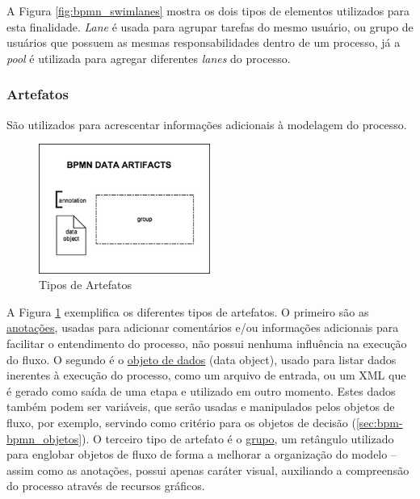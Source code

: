     A Figura \ref{fig:bpmn_swimlanes} mostra os dois tipos de elementos utilizados para esta finalidade. \textit{Lane} é usada para agrupar tarefas do mesmo usuário, ou grupo de usuários que possuem as mesmas responsabilidades dentro de um processo, já a \textit{pool} é utilizada para agregar diferentes \textit{lanes} do processo. 

\subsubsection{Artefatos}\label{sec:bpm-bpmn_objetos_artefatos}

    São utilizados para acrescentar informações adicionais à modelagem do processo. 

    \begin{figure}[H]
    \centering
    \includegraphics[width=0.5\textwidth]{imagens/bpmn_artifacts.png}
    \caption{Tipos de Artefatos\cite{tipos_artefatos}}
    \label{fig:bpmn_artifacts}
    \end{figure}
    
    A Figura \ref{fig:bpmn_artifacts} exemplifica os diferentes tipos de artefatos. O primeiro são as \underline{anotações}, usadas para adicionar comentários e/ou informações adicionais para facilitar o entendimento do processo, não possui nenhuma influência na execução do fluxo. O segundo é o \underline{objeto de dados} (data object), usado para listar dados inerentes à execução do processo, como um arquivo de entrada, ou um XML\cite{xml} que é gerado como saída de uma etapa e utilizado em outro momento. Estes dados também podem ser variáveis, que serão usadas e manipulados pelos objetos de fluxo, por exemplo, servindo como critério para os objetos de decisão (\ref{sec:bpm-bpmn_objetos}). O terceiro tipo de artefato é o \underline{grupo}, um retângulo utilizado para englobar objetos de fluxo de forma a melhorar a organização do modelo -- assim como as anotações, possui apenas caráter visual, auxiliando a compreensão do processo através de recursos gráficos.


